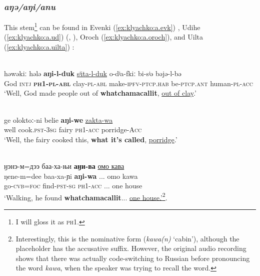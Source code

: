 \documentclass[output=paper,colorlinks,citecolor=brown
\ChapterDOI{10.5281/zenodo.15697577}
]{langscibook}
\begin{document}
\subsubsection{\textit{aŋə/aŋi/anu}}
This stem\footnote{I will gloss it as \textsc{ph1}.} can be found in Evenki (\ref{ex:klyachko:a.evk}) \citep{klyachko2022} , Udihe (\ref{ex:klyachko:a.ud}) (\citealt[16]{Shneider1936}, \citealt[361]{nikolaeva2001grammar}), Oroch (\ref{ex:klyachko:a.oroch}), and Uilta (\ref{ex:klyachko:a.uilta}) \citep[6]{ozolinya2001}:

\ea
\label{ex:klyachko:a.evk}
\\
\gll həwəkiː hələ \textbf{aŋi-l-duk} \uline{sʲita-l-duk} o-dʲa-fkiː bi-sʲə bəjə-l-bə\\
God \textsc{intj} \textbf{\textsc{ph1}-\textsc{pl}-\textsc{abl}} clay-\textsc{pl}-\textsc{abl} make-\textsc{ipfv}-\textsc{ptcp.hab} be-\textsc{ptcp.ant} human-\textsc{pl}-\textsc{acc}\\
\glt `Well, God made people out of \textbf{whatchamacallit}, \uline{out of clay}.' 
\z
{}



\ea
\label{ex:klyachko:a.ud}
\\
\gll ge oloktoː-ni belie \textbf{aŋi-we} \uline{zakta-wa}\\
well cook.\textsc{pst}-\textsc{3sg} fairy \textsc{ph1}-\textsc{acc} porridge-\textsc{Acc}\\
\glt `Well, the fairy cooked this, \textbf{what it's called}, \uline{porridge}.'
\z
{}


\ea
\label{ex:klyachko:a.oroch}
\\
 \glll ӈэнэ-м=дээ	баа-ха-њи \textbf{аӈи-ва} \uline{омо кава}\\
 ŋene-m=dee	baa-xa-ɲi \textbf{aŋi-wa} ... omo kawa\\
 go-\textsc{cvb}=\textsc{foc} find-\textsc{pst}-\textsc{sg} \textsc{ph1}-\textsc{acc} ... one house\\
 \glt `Walking, he found \textbf{whatchamacallit}... \uline{one house.'}\footnote{Interestingly, this is the nominative form (\textit{kawa(n)} `cabin'), although the placeholder has the accusative suffix. However, the original audio recording shows that there was actually code-switching to Russian before pronouncing the word \textit{kawa}, when the speaker was trying to recall the word.}.
\z
{} 
\end{document}
